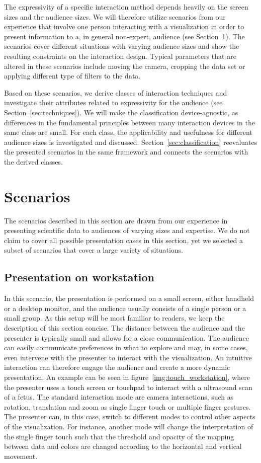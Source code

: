 \documentclass[review,journal]{vgtc}         %
\begin{document}
The expressivity of a specific interaction method depends heavily on the screen sizes and the audience sizes.
We will therefore utilize scenarios from our experience that involve one person interacting with a visualization in order to present information to a, in general non-expert, audience (see Section~\ref{sec:scenario}).
The scenarios cover different situations with varying audience sizes and show the resulting constraints on the interaction design.
Typical parameters that are altered in these scenarios include moving the camera, cropping the data set or applying different type of filters to the data.

Based on these scenarios, we derive classes of interaction techniques and investigate their attributes related to expressivity for the audience (see Section~\ref{sec:techniques}).
We will make the classification device-agnostic, as differences in the fundamental principles between many interaction devices in the same class are small.
For each class, the applicability and usefulness for different audience sizes is investigated and discussed.
Section~\ref{sec:classification} reevaluates the presented scenarios in the same framework and connects the scenarios with the derived classes.

%
%
%
\section{Scenarios} \label{sec:scenario}
The scenarios described in this section are drawn from our experience in presenting scientific data to audiences of varying sizes and expertise.
We do not claim to cover all possible presentation cases in this section, yet we selected a subset of scenarios that cover a large variety of situations.

%
%
\subsection{Presentation on workstation} \label{sec:workstation}
In this scenario, the presentation is performed on a small screen, either handheld or a desktop monitor, and the audience usually consists of a single person or a small group.
As this setup will be most familiar to readers, we keep the description of this section concise.
The distance between the audience and the presenter is typically small and allows for a close communication.
The audience can easily communicate preferences in what to explore and may, in some cases, even intervene with the presenter to interact with the visualization.
An intuitive interaction can therefore engage the audience and create a more dynamic presentation.
An example can be seen in figure~\ref{img:touch_workstation}, where the presenter uses a touch screen or touchpad to interact with a ultrasound scan of a fetus.
The standard interaction mode are camera interactions, such as rotation, translation and zoom as single finger touch or multiple finger gestures.
The presenter can, in this case, switch to different modes to control other aspects of the visualization.
For instance, another mode will change the interpretation of the single finger touch such that the threshold and opacity of the mapping between data and colors are changed according to the horizontal and vertical movement.
\end{document}
